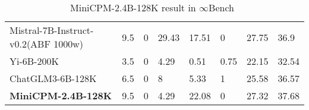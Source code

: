 \begin{table}[htpb]
{\begin{tabular}{m{4cm}m{1.4cm}m{1.0cm}m{1.0cm}m{1.2cm}m{1.2cm}m{1.2cm}m{1.2cm}}
Mistral-7B-Instruct-v0.2(ABF 1000w) & 9.5                   & 0          & 29.43      & 17.51       & 0         & 27.75 & 36.9               \\
Yi-6B-200K                          & 3.5                   & 0          & 4.29       & 0.51        & 0.75      & 22.15 & 32.54              \\
ChatGLM3-6B-128K                    & 6.5                   & 0          & 8          & 5.33        & 1         & 25.58 & 36.57              \\
\midrule
\textbf{MiniCPM-2.4B-128K}                   & 9.5                   & 0          & 4.29       & 22.08       & 0         & 27.32 & 37.68              \\
\bottomrule
\end{tabular}
}
\caption{MiniCPM-2.4B-128K result in $\infty$Bench~\citep{zhang2024infty} }
\label{tab:longcontext}
\end{table}